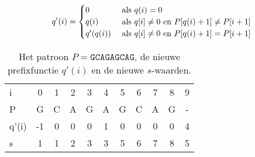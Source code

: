 \begin{itemize}
    $$q'(i) = \begin{cases}
        0 & \hbox{ als } q(i) = 0  \\
        q(i) & \hbox{ als } q[i] \neq 0 \hbox{ en } P[q(i) + 1] \neq P[i + 1] \\
        q'(q(i)) & \hbox{ als } q[i] \neq 0 \hbox{ en } P[q(i) + 1] = P[i + 1] \\
    \end{cases}$$
    \begin{table}[ht]
        \centering
        \begin{tabular}{l | c c c c c c c c c c}
            i   & 0 & 1 & 2 & 3 & 4 & 5 & 6 & 7 & 8 & 9\\
            P   & G & C & A & G & A & G & C & A & G & - \\
                \hline
            q'(i) & -1 & 0 & 0 & 0 & 1 & 0 & 0 & 0 & 0 & 4 \\
            s   & 1 & 1 & 2 & 3 & 3 & 5 & 6 & 7 & 8 & 5
        \end{tabular}
        \caption{Het patroon $P = \texttt{GCAGAGCAG}$, de nieuwe prefixfunctie $q'(i)$ en de nieuwe $s$-waarden.}
        \label{table:kmp2}
    \end{table}

    \begin{table}[ht]
        \centering   
        \caption{De tweede versie van het Knuth-Morris-Prattalgoritme, waarbij $s = i - q'(i)$.}
        \label{table:kmpex2}
    \end{table}

\end{itemize}


